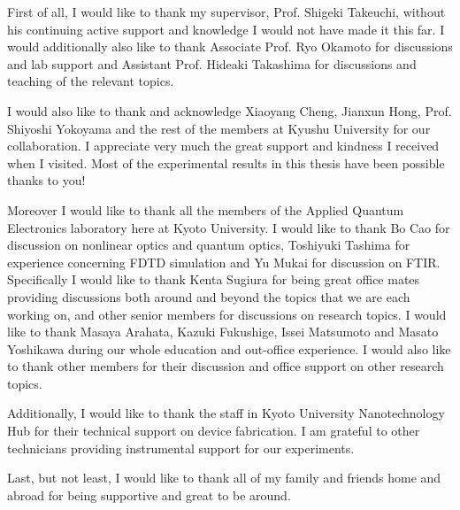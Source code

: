 \documentclass[final]{kuee_en}
\begin{document}
\begin{acknowledgements}

First of all, I would like to thank my supervisor, Prof. Shigeki Takeuchi, without his continuing active support and knowledge I would not have made it this far. I would additionally also like to thank Associate Prof. Ryo Okamoto for discussions and lab support and Assistant Prof. Hideaki Takashima for discussions and teaching of the relevant topics. 

I would also like to thank and acknowledge Xiaoyang Cheng, Jianxun Hong, Prof. Shiyoshi Yokoyama and the rest of the members at Kyushu University for our collaboration. I appreciate very much the great support and kindness
I received when I visited. Most of the experimental results in this thesis have
been possible thanks to you!

Moreover I would like to thank all the members of the Applied Quantum Electronics laboratory
here at Kyoto University. I would like to thank Bo Cao for discussion on nonlinear optics and quantum optics, Toshiyuki Tashima for experience concerning FDTD simulation and Yu Mukai for discussion on FTIR.
Specifically I would like to thank Kenta Sugiura for being great office mates providing discussions both around and beyond the topics that we are each working on, and other senior members for discussions on research topics. I would like to thank Masaya Arahata, Kazuki Fukushige, Issei Matsumoto and Masato Yoshikawa during our whole education and out-office experience. I would also like to thank other members for their discussion and office support on other research topics.

Additionally, I would like to thank the staff in Kyoto University Nanotechnology Hub for their technical support on device fabrication. I am grateful to other technicians providing instrumental support for our experiments. 

Last, but not least, I would like to thank all of my family and friends home and abroad for
being supportive and great to be around.

\end{acknowledgements}


\printbibliography[title=References,heading=bibintoc]

\clearpage %
\processdelayedfloats
\clearpage

\end{document}
